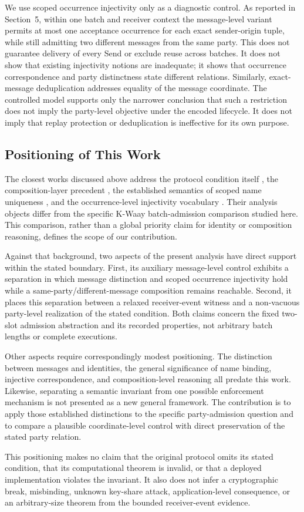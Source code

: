 We use scoped occurrence injectivity only as a diagnostic control. As reported
in Section~5, within one batch and receiver context the message-level variant
permits at most one acceptance occurrence for each exact sender-origin tuple,
while still admitting two different messages from the same party. This does
not guarantee delivery of every Send or exclude reuse across batches. It does
not show that existing
injectivity notions are inadequate; it shows that occurrence correspondence
and party distinctness state different relations. Similarly, exact-message
deduplication addresses equality of the message coordinate. The controlled
model supports only the narrower conclusion that such a restriction does not
imply the party-level objective under the encoded lifecycle. It does not imply
that replay protection or deduplication is ineffective for its own purpose.

\subsection{Positioning of This Work}

The closest works discussed above address the protocol condition itself
\cite{collins2024kwaayfull}, the composition-layer precedent
\cite{cremers2023session}, the established semantics of scoped name uniqueness
\cite{lupetti2006names}, and the occurrence-level injectivity vocabulary
\cite{sattarzadeh2015injective}. Their analysis objects differ from the
specific K-Waay batch-admission comparison studied here. This comparison,
rather than a global priority claim for identity or composition reasoning,
defines the scope of our contribution.

Against that background, two aspects of the present analysis have direct
support within the stated boundary. First, its auxiliary message-level
control exhibits a separation in which message distinction and scoped
occurrence injectivity hold while a same-party/different-message composition
remains reachable. Second, it places this separation between a relaxed
receiver-event witness and a non-vacuous party-level realization of the stated
\batchreceive condition. Both claims concern the fixed two-slot admission abstraction and
its recorded properties, not arbitrary batch lengths or complete \kwaay
executions.

Other aspects require correspondingly modest positioning. The distinction
between messages and identities, the general significance of name binding,
injective correspondence, and composition-level reasoning all predate this
work. Likewise, separating a semantic invariant from one possible enforcement
mechanism is not presented as a new general framework. The contribution is to
apply those established distinctions to the specific \batchreceive
party-admission question and to compare a plausible coordinate-level control
with direct preservation of the stated party relation.

This positioning makes no claim that the original protocol omits its stated
condition, that its computational theorem is invalid, or that a deployed
implementation violates the invariant. It also does not infer a cryptographic
break, misbinding, unknown key-share attack, application-level consequence, or
an arbitrary-size theorem from the bounded receiver-event evidence.
